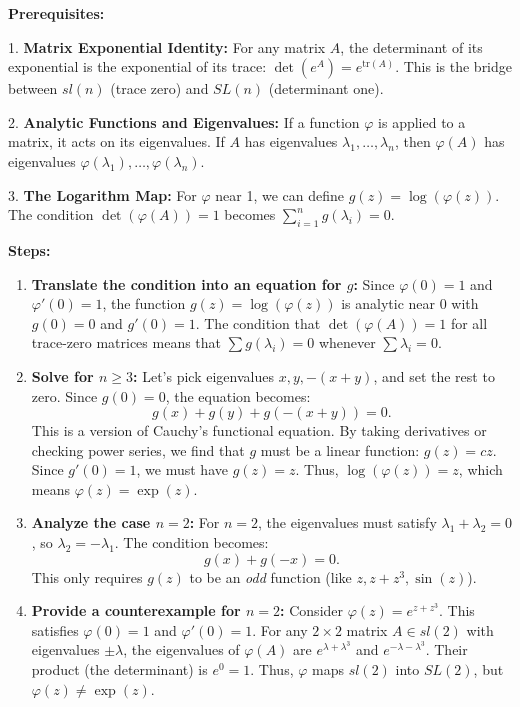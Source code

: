 \begin{solution}
\textbf{Prerequisites:}

1. \textbf{Matrix Exponential Identity:} For any matrix $A$, the determinant of its exponential is the exponential of its trace: $\det(e^A) = e^{\text{tr}(A)}$. This is the bridge between $sl(n)$ (trace zero) and $SL(n)$ (determinant one).

2. \textbf{Analytic Functions and Eigenvalues:} If a function $\varphi$ is applied to a matrix, it acts on its eigenvalues. If $A$ has eigenvalues $\lambda_1, \dots, \lambda_n$, then $\varphi(A)$ has eigenvalues $\varphi(\lambda_1), \dots, \varphi(\lambda_n)$.

3. \textbf{The Logarithm Map:} For $\varphi$ near 1, we can define $g(z) = \log(\varphi(z))$. The condition $\det(\varphi(A))=1$ becomes $\sum_{i=1}^n g(\lambda_i) = 0$.


\textbf{Steps:}
\begin{enumerate}
    \item \textbf{Translate the condition into an equation for $g$:}
        Since $\varphi(0)=1$ and $\varphi'(0)=1$, the function $g(z) = \log(\varphi(z))$ is analytic near 0 with $g(0)=0$ and $g'(0)=1$. The condition that $\det(\varphi(A))=1$ for all trace-zero matrices means that $\sum g(\lambda_i) = 0$ whenever $\sum \lambda_i = 0$.

    \item \textbf{Solve for $n \geq 3$:}
        Let's pick eigenvalues $x, y, -(x+y)$, and set the rest to zero. Since $g(0)=0$, the equation becomes:
        \[ g(x) + g(y) + g(-(x+y)) = 0. \]
        This is a version of Cauchy's functional equation. By taking derivatives or checking power series, we find that $g$ must be a linear function: $g(z) = cz$. Since $g'(0)=1$, we must have $g(z) = z$.
        Thus, $\log(\varphi(z)) = z$, which means $\varphi(z) = \exp(z)$.

    \item \textbf{Analyze the case $n = 2$:}
        For $n=2$, the eigenvalues must satisfy $\lambda_1 + \lambda_2 = 0$, so $\lambda_2 = -\lambda_1$. The condition becomes:
        \[ g(x) + g(-x) = 0. \]
        This only requires $g(z)$ to be an \textit{odd} function (like $z, z+z^3, \sin(z)$).

    \item \textbf{Provide a counterexample for $n=2$:}
        Consider $\varphi(z) = e^{z+z^3}$. This satisfies $\varphi(0)=1$ and $\varphi'(0)=1$. For any $2\times 2$ matrix $A \in sl(2)$ with eigenvalues $\pm \lambda$, the eigenvalues of $\varphi(A)$ are $e^{\lambda+\lambda^3}$ and $e^{-\lambda-\lambda^3}$. Their product (the determinant) is $e^0 = 1$. Thus, $\varphi$ maps $sl(2)$ into $SL(2)$, but $\varphi(z) \neq \exp(z)$.
\end{enumerate}



\end{solution}

